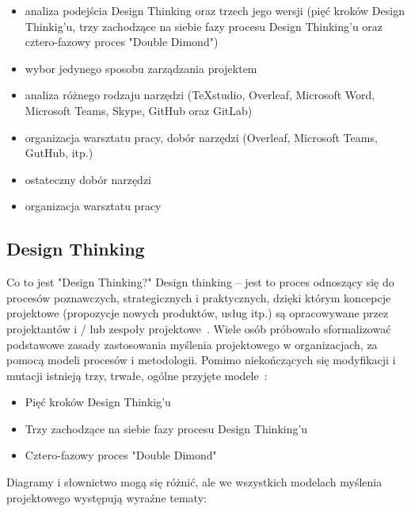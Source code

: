 \documentclass[a4paper,titleauthor]{mwart}
\begin{document}
\begin{itemize}
	\item analiza podejścia Design Thinking oraz trzech jego wersji (pięć kroków Design Thinkig'u, trzy zachodzące na siebie fazy procesu Design Thinking'u oraz cztero-fazowy proces "Double Dimond")
	\item wybor jedynego sposobu zarządzania projektem
	\item analiza różnego rodzaju narzędzi (TeXstudio, Overleaf, Microsoft Word, Microsoft Teams, Skype, GitHub oraz GitLab)
	\item organizacja warsztatu pracy, dobór narzędzi (Overleaf, Microsoft Teams, GutHub, itp.)
	\item ostateczny dobór narzędzi
	\item organizacja warsztatu pracy
\end{itemize}

\subsection{Design Thinking}
\label{sec:design_thinking}
Co to jest "Design Thinking?" \newline
\newline
Design thinking – jest to proces odnoszący się do procesów poznawczych, strategicznych i praktycznych, dzięki którym koncepcje projektowe (propozycje nowych produktów, usług itp.) są opracowywane przez projektantów i / lub zespoły projektowe~\cite{DesignThinking1}. \newline \newline Wiele osób próbowało sformalizować podstawowe zasady zastosowania myślenia projektowego w organizacjach, za pomocą modeli procesów i metodologii. Pomimo niekończących się modyfikacji i mutacji istnieją trzy, trwałe, ogólne przyjęte modele~\cite{DesignThinking2}:

 \begin{itemize}
 	\item Pięć kroków Design Thinkig'u
 	\item Trzy zachodzące na siebie fazy procesu Design Thinking'u
 	\item Cztero-fazowy proces "Double Dimond"
 \end{itemize}

Diagramy i słownictwo mogą się różnić, ale we wszystkich modelach myślenia projektowego występują wyraźne tematy:
\end{document}
